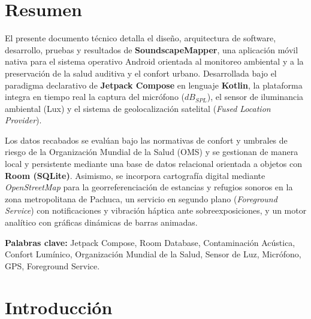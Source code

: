 \documentclass[12pt,a4paper]{article}
\begin{document}
\newpage
\tableofcontents

\newpage
\listoffigures

\newpage

\section{Resumen}

El presente documento técnico detalla el diseño, arquitectura de software, desarrollo, pruebas y resultados de \textbf{SoundscapeMapper}, una aplicación móvil nativa para el sistema operativo Android orientada al monitoreo ambiental y a la preservación de la salud auditiva y el confort urbano. Desarrollada bajo el paradigma declarativo de \textbf{Jetpack Compose} en lenguaje \textbf{Kotlin}, la plataforma integra en tiempo real la captura del micrófono ($dB_{SPL}$), el sensor de iluminancia ambiental (Lux) y el sistema de geolocalización satelital (\textit{Fused Location Provider}). 

Los datos recabados se evalúan bajo las normativas de confort y umbrales de riesgo de la Organización Mundial de la Salud (OMS) y se gestionan de manera local y persistente mediante una base de datos relacional orientada a objetos con \textbf{Room (SQLite)}. Asimismo, se incorpora cartografía digital mediante \textit{OpenStreetMap} para la georreferenciación de estancias y refugios sonoros en la zona metropolitana de Pachuca, un servicio en segundo plano (\textit{Foreground Service}) con notificaciones y vibración háptica ante sobreexposiciones, y un motor analítico con gráficas dinámicas de barras animadas.

\vspace{0.3cm}
\textbf{Palabras clave:} Jetpack Compose, Room Database, Contaminación Acústica, Confort Lumínico, Organización Mundial de la Salud, Sensor de Luz, Micrófono, GPS, Foreground Service.

\section{Introducción}
\end{document}

